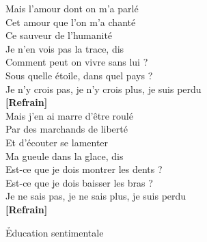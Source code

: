 \documentclass{novel}
\begin{document}
Mais l'amour dont on m'a parlé \\
Cet amour que l'on m'a chanté \\
Ce sauveur de l'humanité \\
Je n'en vois pas la trace, dis \\
Comment peut on vivre sans lui ? \\
Sous quelle étoile, dans quel pays ? \\
Je n'y crois pas, je n'y crois plus, je suis perdu \\

\textbf{[Refrain]} \\

Mais j'en ai marre d'être roulé \\
Par des marchands de liberté \\
Et d'écouter se lamenter \\
Ma gueule dans la glace, dis \\
Est-ce que je dois montrer les dents ? \\
Est-ce que je dois baisser les bras ? \\
Je ne sais pas, je ne sais plus, je suis perdu \\

\textbf{[Refrain]} 

\newpage
\normalsize
\h*{Education sentimentale}
\end{document}

